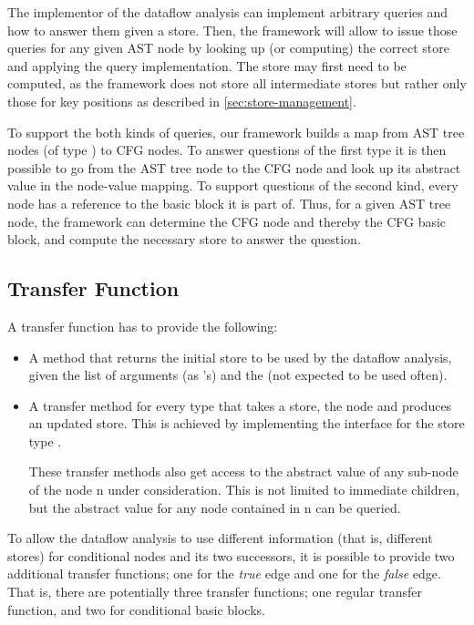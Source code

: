 The implementor
of the dataflow analysis can implement arbitrary queries and how to answer them
given a store. Then, the framework will allow to issue those queries for
any given AST node by looking up (or computing) the correct store and applying the query
implementation.
The store may first need to be computed, as the framework does not store all intermediate
stores but rather only those for key positions as described in \autoref{sec:store-management}.

To support the both kinds of queries, our framework builds a map from AST tree nodes (of type
) to CFG nodes.  To answer questions of the first type it is
then possible to go from the AST tree node to the CFG node and look up its abstract value in
the node-value mapping.  To support questions of the second kind, every node has a reference
to the basic block it is part of. Thus, for a given AST tree node, the framework
can determine the CFG node and thereby the CFG basic block, and compute the necessary store
to answer the question.





\subsection{Transfer Function}
\label{sec:transfer-fnc}

A transfer function has to provide the following:
\begin{itemize}
\item A method that returns the initial store to be used by the dataflow analysis, given
the list of arguments (as 's) and the  (not expected to be used often).
\item A transfer method for every  type that takes a store, the node and produces
an updated store. This is achieved by implementing the  interface
for the store type .

These transfer methods also get access to the abstract value of any sub-node of the node \code n
under consideration.  This is not limited to immediate children, but the abstract value for any node contained
in \code n can be queried.
\end{itemize}

To allow the dataflow analysis to use different information (that is, different stores)
for conditional nodes and its two successors, it is possible to provide two additional
transfer functions; one for the \emph{true} edge and one for the \emph{false} edge.
That is, there are potentially three transfer functions; one regular transfer function, and two
for conditional basic blocks.


